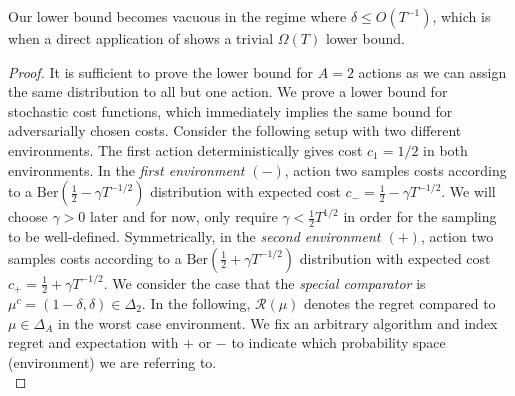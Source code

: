 \thmLowerNfg*

Our lower bound becomes vacuous in the regime where $\delta \leq O( T^{-1})$, which is when a direct application of \citet{lattimore2015pareto} shows a trivial $\Omega(T)$ lower bound.

\begin{proof}
    It is sufficient to prove the lower bound for $A=2$ actions as we can assign the same distribution to all but one action. We prove a lower bound for stochastic cost functions, which immediately implies the same bound for adversarially chosen costs. Consider the following setup with two different environments. The first action deterministically gives cost $c_1 = 1/2$ in both environments. In the \textit{first environment $(-)$}, action two samples costs according to a $\text{Ber}(\frac{1}{2}-\gamma T^{-1/2})$ distribution with expected cost $c_- = \frac{1}{2}-\gamma T^{-1/2}$. We will choose $\gamma>0$ later and for now, only require $\gamma < \frac{1}{2}T^{1/2}$ in order for the sampling to be well-defined. Symmetrically, in the \textit{second environment $(+)$}, action two samples costs according to a $\text{Ber}(\frac{1}{2}+\gamma T^{-1/2})$ distribution with expected cost $c_+ = \frac{1}{2}+\gamma T^{-1/2}$. We consider the case that the \textit{special comparator} is $\mu^c = (1-\delta,\delta)\in\Delta_2$. In the following, $\mathcal{R}(\mu)$ denotes the regret compared to $\mu\in\Delta_A$ in the worst case environment. We fix an arbitrary algorithm and index regret and expectation with $+$ or $-$ to indicate which probability space (environment) we are referring to.\\


\end{proof}
